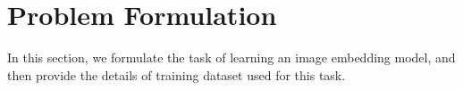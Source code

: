 \documentclass[sigconf]{acmart}
\begin{document}
\begin{comment}
While the complexity of deep models has continued to increase, the amount of training data for visual tasks has remained constant over years~\cite{sun2017revisiting}. The major reason behind this is the difficulty of collecting large-scale clean datasets, as it is time consuming and expensive to manually verify the correctness of labels. For instance, it took more than a year of human labor on Amazon Mechanical Turk for collecting the ImageNet dataset~\cite{deng2009imagenet}. To address this limitation, several studies have been focused on directly learning discriminative models from noisy-labeled data~\cite{joulin2016learning,manwani2013noise}. In~\cite{natarajan2013learning}, the label noise is modeled as conditionally independent from the input image, while the visual modes and related noise can hardly be distinguished without taking the input image into account. Some propose image-conditional noise models that either explicitly predict and remove label noise~\cite{xiao2015learning}, identify the missing labels~\cite{misra2016seeing}, or learn a mapping between noisy and clean labels and then exploit the mapping for training an image classification model~\cite{veit2017learning}. 

On the other hand, label noise reduction using human supervision has been widely studied for dataset constructions. Some of the large-scale training data were constructed using classifiers trained on manually verified seed images to remove label noise. For example, LSUN~\cite{song2015construction} was constructed using multilayer perceptrons (MLPs) and Places~\cite{zhou2017places} was using AlextNet~\cite{krizhevsky2012imagenet}. Another way of removing label noise is to apply semi-supervised learning (SSL) approaches, where a small set of clean labels is combined with a large amount of noisy labels. SSL approaches use label propagation such as graph-based approaches~\cite{fergus2009semi} or constrained with structured knowledge base~\cite{chen2013neil}. Our work belongs the SSL realm, however focusing on providing an efficient and scalable method that leverages both visual representations and the prior knowledge of image relations for constructing clean image dataset in web-scale. 
\end{comment} 
\section{Problem Formulation}
\label{sec:Problem Formulation}
In this section, we formulate the task of learning an image embedding model, and then provide the details of training dataset used for this task.
\end{document}
